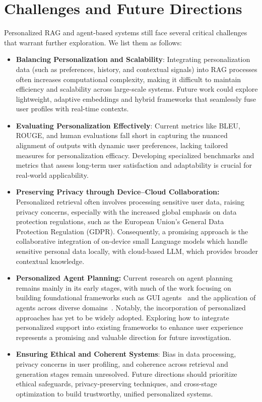 \section{Challenges and Future Directions}
\label{sec:futuredirection}

Personalized RAG and agent-based systems still face several critical challenges that warrant further exploration. We list them as follows:
\begin{itemize}[leftmargin=*]
    \item \textbf{Balancing Personalization and Scalability}: Integrating personalization data (such as preferences, history, and contextual signals) into RAG processes often increases computational complexity,
    making it difficult to maintain efficiency and scalability across large-scale systems. Future work could explore lightweight, adaptive embeddings and hybrid frameworks that seamlessly fuse user profiles with real-time contexts.
    \item \textbf{Evaluating Personalization Effectively}: Current metrics like BLEU, ROUGE, and human evaluations fall short in capturing the nuanced alignment of outputs with dynamic user preferences, lacking tailored measures for personalization efficacy. Developing specialized benchmarks and metrics that assess long-term user satisfaction and adaptability is crucial for real-world applicability.
    \item \textbf{Preserving Privacy through Device–Cloud Collaboration:} Personalized retrieval often involves processing sensitive user data, raising privacy concerns, especially with the increased global emphasis on data protection regulations, such as the European Union’s General Data Protection Regulation (GDPR). Consequently, a promising approach is the collaborative integration of on-device small Language models which handle sensitive personal data locally, with cloud-based LLM, which provides broader contextual knowledge. 
    \item \textbf{Personalized Agent Planning:} Current research on agent planning remains mainly in its early stages, with much of the work focusing on building foundational frameworks such as GUI agents~\cite{nguyen2024gui} and the application of agents across diverse domains~\cite{wang2024survey}. Notably, the incorporation of personalized approaches has yet to be widely adopted. Exploring how to integrate personalized support into existing frameworks to enhance user experience represents a promising and valuable direction for future investigation.
    \item \textbf{Ensuring Ethical and Coherent Systems}: Bias in data processing, privacy concerns in user profiling, and coherence across retrieval and generation stages remain unresolved. Future directions should prioritize ethical safeguards, privacy-preserving techniques, and cross-stage optimization to build trustworthy, unified personalized systems.
\end{itemize}
